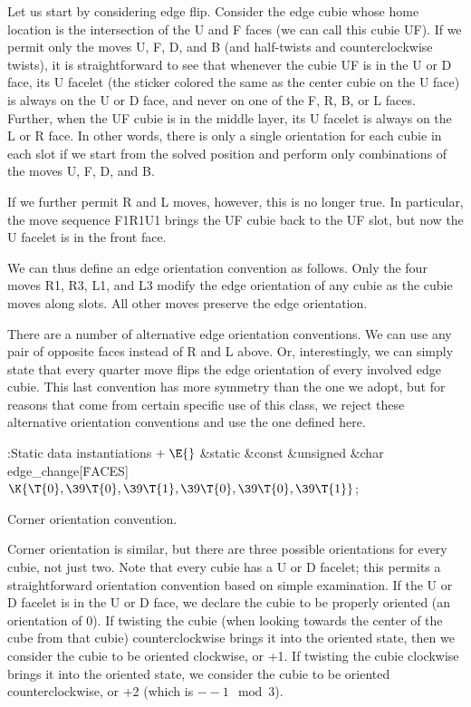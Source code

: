 Let us start by considering edge flip.  Consider the edge cubie whose
home location is the intersection of the U and F faces (we can call
this cubie UF).  If we permit only the moves U, F, D, and B (and
half-twists and counterclockwise twists), it is straightforward to see
that whenever the cubie UF is in the U or D face, its U facelet (the
sticker colored the same as the center cubie on the U face) is always
on the U or D face, and never on one of the F, R, B, or L faces.
Further, when the UF cubie is in the middle layer, its U facelet is
always on the L or R face.  In other words, there is only a single
orientation for each cubie in each slot if we start from the solved
position and perform only combinations of the moves U, F, D, and B.

If we further permit R and L moves, however, this is no longer true.
In particular, the move sequence F1R1U1 brings the UF cubie back to
the UF slot, but now the U facelet is in the front face.

We can thus define an edge orientation convention as follows.  Only
the four moves R1, R3, L1, and L3 modify the edge orientation of any
cubie as the cubie moves along slots.  All other moves preserve
the edge orientation.

There are a number of alternative edge orientation conventions.  We
can use any pair of opposite faces instead of R and L above.  Or,
interestingly, we can simply state that every quarter move flips
the edge orientation of every involved edge cubie.  This last
convention has more symmetry than the one we adopt, but for reasons
that come from certain specific use of this class, we reject these
alternative orientation conventions and use the one defined here.

\Y\B\4:Static data instantiations\X${}\mathrel+\E{}$\6
\&{static} \&{const} \&{unsigned} \&{char} \\{edge\_change}[\.{FACES}]${}\K\{%
\T{0},\39\T{0},\39\T{1},\39\T{0},\39\T{0},\39\T{1}\}{}$;\par
\fi

Corner orientation convention.

Corner orientation is similar, but there are three possible
orientations for every cubie, not just two.  Note that every cubie has
a U or D facelet; this permits a straightforward orientation
convention based on simple examination.  If the U or D facelet is in
the U or D face, we declare the cubie to be properly oriented (an
orientation of 0).  If twisting the cubie (when looking towards the
center of the cube from that cubie) counterclockwise brings it into
the oriented state, then we consider the cubie to be oriented
clockwise, or +1.  If twisting the cubie clockwise brings it into the
oriented state, we consider the cubie to be oriented counterclockwise,
or +2 (which is $--1\mod 3$).

